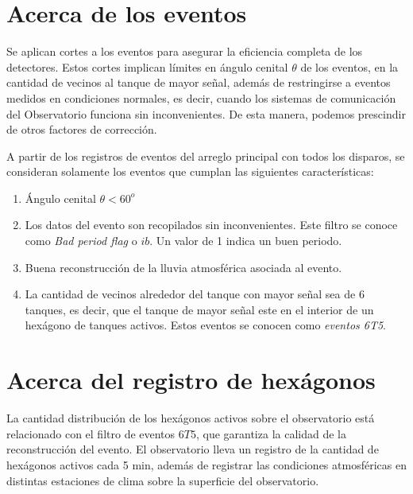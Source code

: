 \section{Acerca de los eventos} \label{filtro}

Se aplican cortes a los eventos para asegurar la eficiencia completa de los detectores. Estos cortes implican límites en ángulo cenital $\theta$ de los eventos, en la cantidad de vecinos al tanque de mayor señal, además de restringirse a eventos medidos en condiciones normales, es decir, cuando los sistemas de comunicación del Observatorio funciona sin inconvenientes. De esta manera, podemos prescindir de otros factores de corrección.

A partir de los registros de eventos del arreglo principal con todos los disparos, se consideran solamente los eventos que cumplan las siguientes características:

    \begin{enumerate}
      \item Ángulo cenital $\theta < 60^o$
      \item Los datos del evento son recopilados sin inconvenientes. Este filtro se conoce como \emph{Bad period flag} o $ib$. Un valor de 1 indica un buen periodo.
      \item Buena reconstrucción de la lluvia atmosférica asociada al evento.
      \item La cantidad de vecinos alrededor del tanque con mayor señal sea de 6 tanques, es decir, que el tanque de mayor señal este en el interior de un hexágono de tanques activos. Estos eventos se conocen como \textit{eventos 6T5}.
    \end{enumerate}


\section{Acerca del registro de hexágonos}\label{hexagonos_rate}

La cantidad distribución de los hexágonos activos sobre el observatorio está relacionado con el filtro de eventos $6T5$, que garantiza la calidad de la reconstrucción del evento. El observatorio lleva un registro de la cantidad de hexágonos activos cada 5 min, además de registrar las condiciones atmosféricas en distintas estaciones de clima sobre la superficie del observatorio. 

